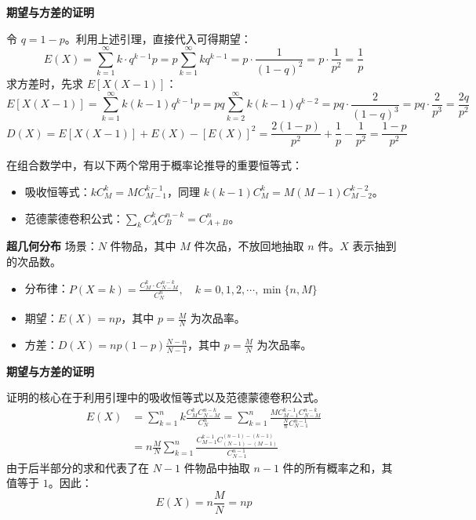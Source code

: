 \textbf{期望与方差的证明}\quad 

令 $q = 1-p$。利用上述引理，直接代入可得期望：
$$ E(X) = \sum_{k=1}^{\infty} k \cdot q^{k-1}p = p \sum_{k=1}^{\infty} k q^{k-1} = p \cdot \frac{1}{(1-q)^2} = p \cdot \frac{1}{p^2} = \frac{1}{p} $$
求方差时，先求 $E[X(X-1)]$：
$$ E[X(X-1)] = \sum_{k=1}^{\infty} k(k-1) q^{k-1}p = pq \sum_{k=2}^{\infty} k(k-1)q^{k-2} = pq \cdot \frac{2}{(1-q)^3} = pq \cdot \frac{2}{p^3} = \frac{2q}{p^2} $$
$$ D(X) = E[X(X-1)] + E(X) - [E(X)]^2 = \frac{2(1-p)}{p^2} + \frac{1}{p} - \frac{1}{p^2} = \frac{1-p}{p^2} $$

\vspace{1em}
\begin{引理Sec11}[组合数恒等式]
	在组合数学中，有以下两个常用于概率论推导的重要恒等式：
	\begin{itemize}
		\item 吸收恒等式：$k C_M^k = M C_{M-1}^{k-1}$，同理 $k(k-1)C_M^k = M(M-1)C_{M-2}^{k-2}$。
		\item 范德蒙德卷积公式：$\sum_{k} C_A^k C_B^{n-k} = C_{A+B}^n$。
	\end{itemize}
\end{引理Sec11}

\textbf{超几何分布} \quad 场景：$N$ 件物品，其中 $M$ 件次品，不放回地抽取 $n$ 件。$X$ 表示抽到的次品数。
\begin{itemize}
    \item 分布律：$P(X=k) = \frac{C_M^k \cdot C_{N-M}^{n-k}}{C_N^n}, \quad k=0,1,2,\cdots,\min\{n, M\}$
    \item 期望：$E(X) = np$，其中 $p = \frac{M}{N}$ 为次品率。
    \item 方差：$D(X) = np(1-p)\frac{N-n}{N-1}$，其中 $p = \frac{M}{N}$ 为次品率。
\end{itemize}

\textbf{期望与方差的证明}\quad 

证明的核心在于利用引理中的吸收恒等式以及范德蒙德卷积公式。
$$ 
\begin{aligned}
E(X) &= \sum_{k=1}^{n} k \frac{C_M^k C_{N-M}^{n-k}}{C_N^n} = \sum_{k=1}^{n} \frac{M C_{M-1}^{k-1} C_{N-M}^{n-k}}{\frac{N}{n} C_{N-1}^{n-1}} \\
&= n \frac{M}{N} \sum_{k=1}^{n} \frac{C_{M-1}^{k-1} C_{(N-1)-(M-1)}^{(n-1)-(k-1)}}{C_{N-1}^{n-1}}
\end{aligned}
$$
由于后半部分的求和代表了在 $N-1$ 件物品中抽取 $n-1$ 件的所有概率之和，其值等于 $1$。因此：
$$ E(X) = n \frac{M}{N} = np $$

